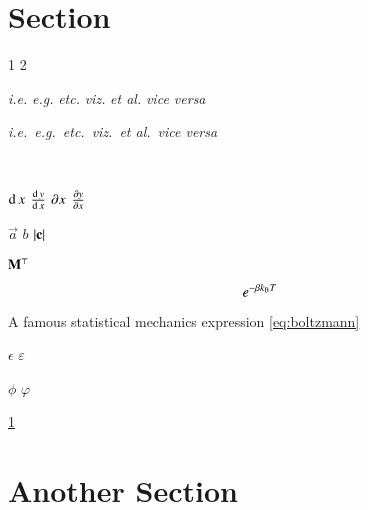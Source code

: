 \documentclass{article}
\begin{document}
\section{Section}%
\label{sec:section}

1 2

\raggedright{}
\textit{i.e.}  \textit{e.g.} \textit{etc.} \textit{viz.} \textit{et al.}
\textit{vice versa}\par
\textit{i.e.}\  \textit{e.g.}\ \textit{etc.}\ \textit{viz.}\ \textit{et al.}\
\textit{vice versa}\par
\ie{}\ \eg{}\ \etc{}\ \viz{}\ \etal{}\ \vive{}

$\mathrm{d}\,x$ $\frac{ \mathrm{d}\,y }{ \mathrm{d}\,x }$ $\partial x$ $\frac{ \partial y }{ \partial x }$

$\vec{a}$ $\unit{b}$ $\left\lvert\mathbf{c}\right\rvert$

$\mathbf{M}^{\top}$

\begin{equation}
  e^{- \beta k_{\mathrm{B}} T}
  \label{eq:boltzmann}
\end{equation}

A famous statistical mechanics expression \cref{eq:boltzmann}

$\epsilon$ $\varepsilon$

$\phi$ $\varphi$

\cref{sec:section}

\section{Another Section}
\end{document}
